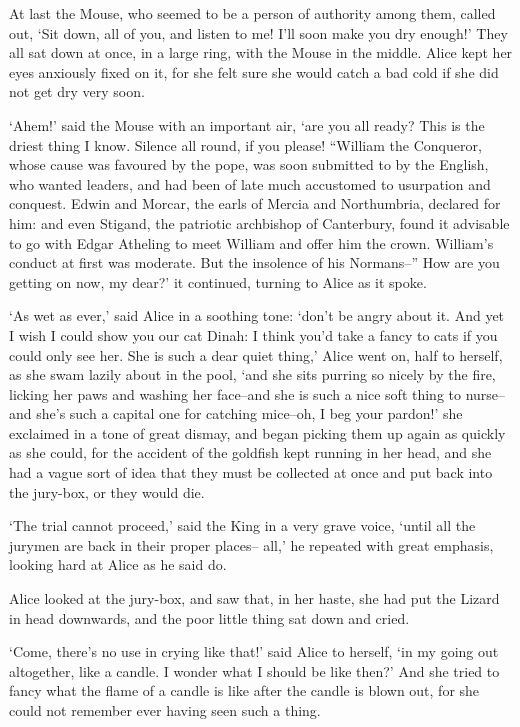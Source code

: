 \documentclass[statementpaper,twoside,openany]{memoir}
\begin{document}
At last the Mouse, who seemed to be a person of authority among them, called out, `Sit down, all of you, and listen to me! I'll soon make you dry enough!' They all sat down at once, in a large ring, with the Mouse in the middle. Alice kept her eyes anxiously fixed on it, for she felt sure she would catch a bad cold if she did not get dry very soon.

`Ahem!' said the Mouse with an important air, `are you all ready? This is the driest thing I know. Silence all round, if you please! ``William the Conqueror, whose cause was favoured by the pope, was soon submitted to by the English, who wanted leaders, and had been of late much accustomed to usurpation and conquest. Edwin and Morcar, the earls of Mercia and Northumbria, declared for him: and even Stigand, the patriotic archbishop of Canterbury, found it advisable to go with Edgar Atheling to meet William and offer him the crown. William's conduct at first was moderate. But the insolence of his Normans--'' How are you getting on now, my dear?' it continued, turning to Alice as it spoke.

`As wet as ever,' said Alice in a soothing tone: `don't be angry about it. And yet I wish I could show you our cat Dinah: I think you'd take a fancy to cats if you could only see her. She is such a dear quiet thing,' Alice went on, half to herself, as she swam lazily about in the pool, `and she sits purring so nicely by the fire, licking her paws and washing her face--and she is such a nice soft thing to nurse--and she's such a capital one for catching mice--oh, I beg your pardon!' she exclaimed in a tone of great dismay, and began picking them up again as quickly as she could, for the accident of the goldfish kept running in her head, and she had a vague sort of idea that they must be collected at once and put back into the jury-box, or they would die.

`The trial cannot proceed,' said the King in a very grave voice, `until all the jurymen are back in their proper places-- all,' he repeated with great emphasis, looking hard at Alice as he said do.

Alice looked at the jury-box, and saw that, in her haste, she had put the Lizard in head downwards, and the poor little thing sat down and cried.

`Come, there's no use in crying like that!' said Alice to herself, `in my going out altogether, like a candle. I wonder what I should be like then?' And she tried to fancy what the flame of a candle is like after the candle is blown out, for she could not remember ever having seen such a thing.
\end{document}
